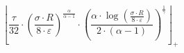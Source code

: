 \[\left\lfloor \frac{\tau}{32} \cdot \left(\frac{\sigma \cdot R}{8 \cdot \varepsilon}\right)^{\frac{\alpha}{\alpha - 1}} \cdot \left(\frac{\alpha \cdot \log\left(\frac{\sigma \cdot R}{8 \cdot \varepsilon}\right)}{2 \cdot \left(\alpha - 1\right)}\right)^{\frac{1}{\gamma}} \right\rfloor_{+}\]
